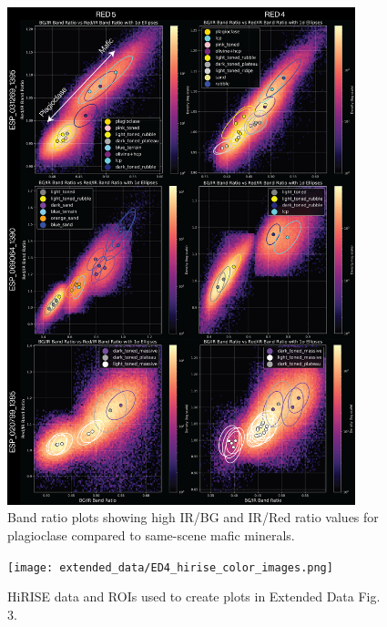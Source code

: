 \documentclass[12pt]{article}
\newenvironment{figurehere}[1][0.85]
  {\begin{figure}[p]
   \begin{minipage}[c][0.80\textheight][c]{\linewidth}
   \centering
   \setlength{\textfloatsep}{0pt}}
  {\end{minipage}
   \end{figure}}
\begin{document}
\clearpage

\begin{figurehere}
    \includegraphics[width=0.9\textwidth]{extended_data/ED3_hirise_color_params.png}
    \caption[Band ratio plots for plagioclase and mafic minerals.]{Band ratio plots showing high IR/BG and IR/Red ratio values for plagioclase compared to same-scene mafic minerals.}
    \label{fig:extended_data_figure3}
\end{figurehere}

\clearpage

\begin{figurehere}
    \texttt{[image: extended\_data/ED4\_hirise\_color\_images.png]}
    \caption[HiRISE data and ROIs used for band ratio plots.]{HiRISE data and ROIs used to create plots in Extended Data Fig. 3.}
    \label{fig:extended_data_figure4}
\end{figurehere}

\clearpage
\end{document}
